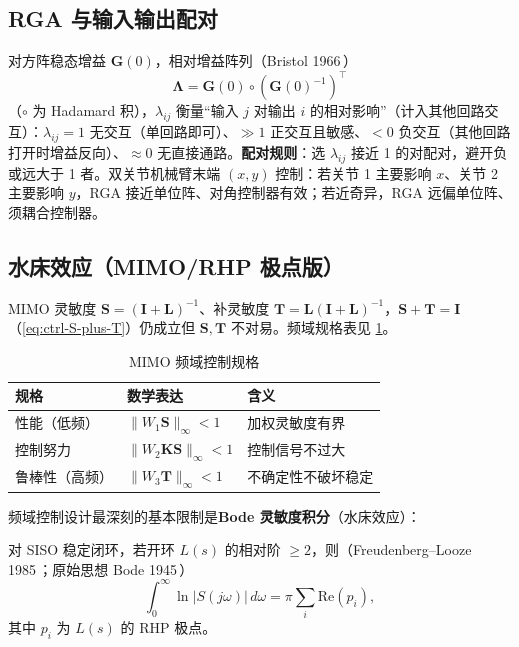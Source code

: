 \subsection{RGA 与输入输出配对}
对方阵稳态增益 $\mathbf G(0)$，相对增益阵列（Bristol 1966\,\cite{bristol1966rga}）
\begin{equation}
  \boldsymbol\Lambda=\mathbf G(0)\circ(\mathbf G(0)^{-1})^\top
\end{equation}
（$\circ$ 为 Hadamard 积），$\lambda_{ij}$ 衡量“输入 $j$ 对输出 $i$ 的相对影响”（计入其他回路交互）：$\lambda_{ij}=1$ 无交互（单回路即可）、$\gg1$ 正交互且敏感、$<0$ 负交互（其他回路打开时增益反向）、$\approx0$ 无直接通路。\textbf{配对规则}：选 $\lambda_{ij}$ 接近 1 的对配对，避开负或远大于 1 者。双关节机械臂末端 $(x,y)$ 控制：若关节 1 主要影响 $x$、关节 2 主要影响 $y$，RGA 接近单位阵、对角控制器有效；若近奇异，RGA 远偏单位阵、须耦合控制器。

\subsection{水床效应（MIMO/RHP 极点版）}
MIMO 灵敏度 $\mathbf S=(\mathbf I+\mathbf L)^{-1}$、补灵敏度 $\mathbf T=\mathbf L(\mathbf I+\mathbf L)^{-1}$，$\mathbf S+\mathbf T=\mathbf I$（\cref{eq:ctrl-S-plus-T}）仍成立但 $\mathbf S,\mathbf T$ 不对易。频域规格表见 \cref{tab:freq-spec}。

\begin{table}[H]\centering\small
\caption{MIMO 频域控制规格}
\label{tab:freq-spec}
\begin{tabular}{lll}
\toprule
规格 & 数学表达 & 含义 \\
\midrule
性能（低频） & $\|W_1\mathbf S\|_\infty<1$ & 加权灵敏度有界 \\
控制努力 & $\|W_2\mathbf K\mathbf S\|_\infty<1$ & 控制信号不过大 \\
鲁棒性（高频） & $\|W_3\mathbf T\|_\infty<1$ & 不确定性不破坏稳定 \\
\bottomrule
\end{tabular}
\end{table}

频域控制设计最深刻的基本限制是\textbf{Bode 灵敏度积分}（水床效应）：

\begin{theorem}
\label{thm:bode-integral}
对 SISO 稳定闭环，若开环 $L(s)$ 的相对阶 $\ge2$，则（Freudenberg--Looze 1985\,\cite{freudenberg1985rhp}；原始思想 Bode 1945\,\cite{bode1945network}）
\begin{equation}
  \int_0^\infty\ln|S(j\omega)|\,d\omega=\pi\sum_i\mathrm{Re}(p_i),
  \label{eq:bode-integral}
\end{equation}
其中 $p_i$ 为 $L(s)$ 的 RHP 极点。
\end{theorem}

